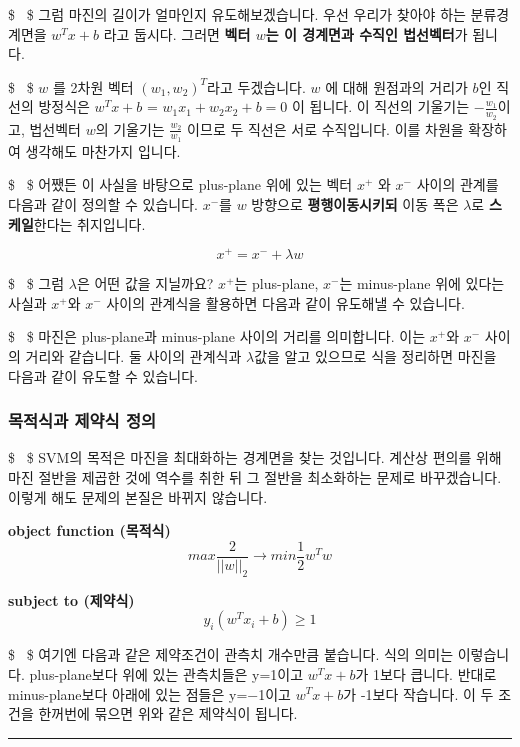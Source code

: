 \documentclass[11pt]{article}
\begin{document}
\$ ~\$ 그럼 마진의 길이가 얼마인지 유도해보겠습니다. 우선 우리가 찾아야
하는 분류경계면을 \textbf{\(w^Tx + b\)} 라고 둡시다. 그러면 \textbf{벡터
\(w\)는 이 경계면과 수직인 법선벡터}가 됩니다.

\$ ~\$ \textbf{\(w\)} 를 2차원 벡터 \((w_1,w_2)^T\)라고 두겠습니다.
\textbf{\(w\)} 에 대해 원점과의 거리가 \(b\)인 직선의 방정식은
\(w^Tx + b\) = \(w_1x_1 + w_2x_2 + b = 0\) 이 됩니다. 이 직선의 기울기는
\(-\frac{w_1}{w_2}\)이고, 법선벡터 \(w\)의 기울기는 \(\frac{w_2}{w_1}\)
이므로 두 직선은 서로 수직입니다. 이를 차원을 확장하여 생각해도 마찬가지
입니다.

\$ ~\$ 어쨌든 이 사실을 바탕으로 plus-plane 위에 있는 벡터 \(x^+\) 와
\(x^−\) 사이의 관계를 다음과 같이 정의할 수 있습니다. \(x^−\)를 \(w\)
방향으로 \textbf{평행이동시키되} 이동 폭은 \(\lambda\)로
\textbf{스케일}한다는 취지입니다.

\[
x^+ = x^- + \lambda w
\]

\$ ~\$ 그럼 \(\lambda\)은 어떤 값을 지닐까요? \(x^+\)는 plus-plane,
\(x^-\)는 minus-plane 위에 있다는 사실과 \(x^+\)와 \(x^−\) 사이의
관계식을 활용하면 다음과 같이 유도해낼 수 있습니다.

\$ ~\$ 마진은 plus-plane과 minus-plane 사이의 거리를 의미합니다. 이는
\(x^+\)와 \(x^-\) 사이의 거리와 같습니다. 둘 사이의 관계식과
\(\lambda\)값을 알고 있으므로 식을 정리하면 마진을 다음과 같이 유도할 수
있습니다.

    \subsubsection{목적식과 제약식
정의}\label{uxbaa9uxc801uxc2dduxacfc-uxc81cuxc57duxc2dd-uxc815uxc758}

\$ ~\$ SVM의 목적은 마진을 최대화하는 경계면을 찾는 것입니다. 계산상
편의를 위해 마진 절반을 제곱한 것에 역수를 취한 뒤 그 절반을 최소화하는
문제로 바꾸겠습니다. 이렇게 해도 문제의 본질은 바뀌지 않습니다.

\textbf{object function (목적식)} \[
max \frac{2}{||w||_2} \rightarrow min \frac{1}{2}w^Tw
\]

\textbf{subject to (제약식)} \[
y_i(w^Tx_i+b)≥1 
\]

\$ ~\$ 여기엔 다음과 같은 제약조건이 관측치 개수만큼 붙습니다. 식의
의미는 이렇습니다. plus-plane보다 위에 있는 관측치들은 y=1이고
\(w^Tx+b\)가 1보다 큽니다. 반대로 minus-plane보다 아래에 있는 점들은
y=−1이고 \(w^Tx+b\)가 -1보다 작습니다. 이 두 조건을 한꺼번에 묶으면 위와
같은 제약식이 됩니다.

\begin{center}\rule{0.5\linewidth}{\linethickness}\end{center}
\end{document}
